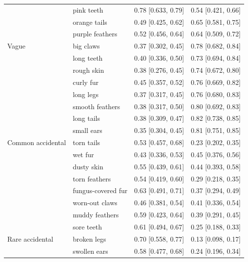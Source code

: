 \documentclass[10pt,letterpaper]{article}
\begin{document}
\begin{table}[h]
\begin{tabular}{| l || l | l | l |}
                 & pink teeth         & 0.78 {[}0.633, 0.79{]} & 0.54 {[}0.421, 0.66{]} \\
                 & orange tails       & 0.49 {[}0.425, 0.62{]} & 0.65 {[}0.581, 0.75{]} \\
                 & purple feathers    & 0.52 {[}0.456, 0.64{]} & 0.64 {[}0.509, 0.72{]} \\
Vague            & big claws          & 0.37 {[}0.302, 0.45{]} & 0.78 {[}0.682, 0.84{]} \\
                 & long teeth         & 0.40 {[}0.336, 0.50{]} & 0.73 {[}0.694, 0.84{]} \\
                 & rough skin         & 0.38 {[}0.276, 0.45{]} & 0.74 {[}0.672, 0.80{]} \\
                 & curly fur          & 0.45 {[}0.357, 0.52{]} & 0.76 {[}0.669, 0.82{]} \\
                 & long legs          & 0.37 {[}0.317, 0.45{]} & 0.76 {[}0.680, 0.83{]} \\
                 & smooth feathers    & 0.38 {[}0.317, 0.50{]} & 0.80 {[}0.692, 0.83{]} \\
                 & long tails         & 0.38 {[}0.309, 0.47{]} & 0.82 {[}0.738, 0.85{]} \\
                 & small ears         & 0.35 {[}0.304, 0.45{]} & 0.81 {[}0.751, 0.85{]} \\
Common accidental & torn tails         & 0.53 {[}0.457, 0.68{]} & 0.23 {[}0.202, 0.35{]} \\
      & wet fur            & 0.43 {[}0.336, 0.53{]} & 0.45 {[}0.376, 0.56{]} \\
      & dusty skin         & 0.55 {[}0.439, 0.61{]} & 0.44 {[}0.393, 0.58{]} \\
      & torn feathers      & 0.54 {[}0.419, 0.60{]} & 0.29 {[}0.218, 0.35{]} \\
      & fungus-covered fur & 0.63 {[}0.491, 0.71{]} & 0.37 {[}0.294, 0.49{]} \\
      & worn-out claws     & 0.46 {[}0.381, 0.54{]} & 0.41 {[}0.336, 0.54{]} \\
      & muddy feathers     & 0.59 {[}0.423, 0.64{]} & 0.39 {[}0.291, 0.45{]} \\
      & sore teeth         & 0.61 {[}0.494, 0.67{]} & 0.25 {[}0.188, 0.33{]} \\
Rare accidental & broken legs        & 0.70 {[}0.558, 0.77{]} & 0.13 {[}0.098, 0.17{]} \\
       & swollen ears       & 0.58 {[}0.477, 0.68{]} & 0.24 {[}0.196, 0.34{]} \\

\end{tabular}
\end{table}
\end{document}
